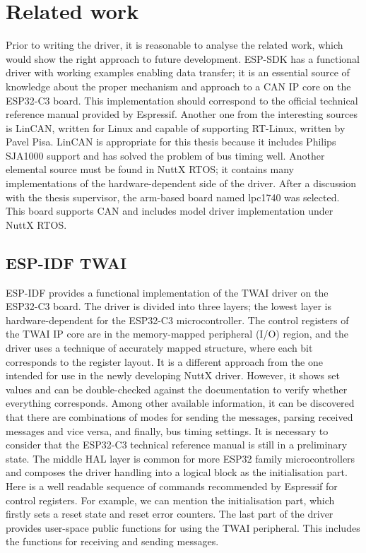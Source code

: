 \documentclass{ctuthesis}
\begin{document}
 \section{Related work}
 Prior to writing the driver, it is reasonable to analyse the related work, which would show the right approach to future development. ESP-SDK has a functional driver with working examples enabling data transfer; it is an essential source of knowledge about the proper mechanism and approach to a CAN IP core on the ESP32-C3 board. This implementation should correspond to the official technical reference manual provided by Espressif\cite{esp32c3-trm}. Another one from the interesting sources is LinCAN, written for Linux and capable of supporting RT-Linux, written by Pavel Pisa. LinCAN is appropriate for this thesis because it includes Philips SJA1000 support and has solved the problem of bus timing well. Another elemental source must be found in NuttX RTOS; it contains many implementations of the hardware-dependent side of the driver. After a discussion with the thesis supervisor, the arm-based board named lpc17\text{-}40 was selected. This board supports CAN and includes model driver implementation under NuttX RTOS. 

 \subsection{ESP-IDF TWAI}
 ESP-IDF provides a functional implementation of the TWAI driver on the ESP32-C3 board. The driver is divided into three layers; the lowest layer is hardware-dependent for the ESP32-C3 microcontroller. The control registers of the TWAI IP core are in the memory-mapped peripheral (I/O) region, and the driver uses a technique of accurately mapped structure, where each bit corresponds to the register layout. It is a different approach from the one intended for use in the newly developing NuttX driver. However, it shows set values and can be double-checked against the documentation to verify whether everything corresponds. Among other available information, it can be discovered that there are combinations of modes for sending the messages, parsing received messages and vice versa, and finally, bus timing settings. It is necessary to consider that the ESP32-C3 technical reference manual is still in a preliminary state. The middle HAL layer is common for more ESP32 family microcontrollers and composes the driver handling into a logical block as the initialisation part. Here is a well readable sequence of commands recommended by Espressif for control registers. For example, we can mention the initialisation part, which firstly sets a reset state and reset error counters. The last part of the driver provides user-space public functions for using the TWAI peripheral. This includes the functions for receiving and sending messages.
 
\end{document}
